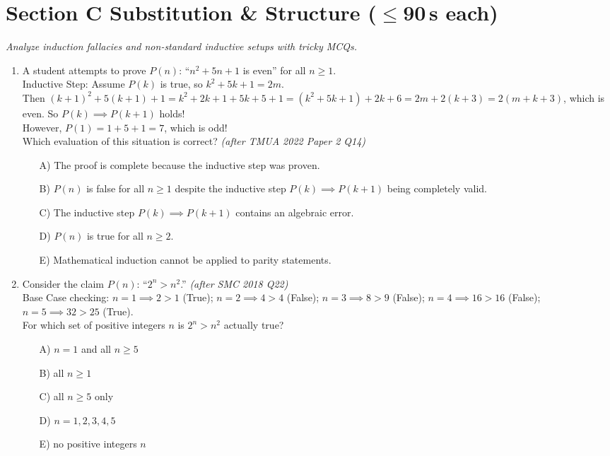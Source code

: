 \documentclass[11pt,a4paper]{article}
\begin{document}
\section*{Section C \quad Substitution \& Structure \hfill{\normalfont\small($\leq$90\,s each)}}

\noindent\textit{Analyze induction fallacies and non-standard inductive setups with tricky MCQs.}

\begin{enumerate}

\item A student attempts to prove $P(n)$: ``$n^2 + 5n + 1$ is even'' for all $n \ge 1$.\\
Inductive Step: Assume $P(k)$ is true, so $k^2 + 5k + 1 = 2m$.\\
Then $(k+1)^2 + 5(k+1) + 1 = k^2 + 2k + 1 + 5k + 5 + 1 = (k^2 + 5k + 1) + 2k + 6 = 2m + 2(k+3) = 2(m + k + 3)$, which is even. So $P(k) \implies P(k+1)$ holds!\\
However, $P(1) = 1 + 5 + 1 = 7$, which is odd!\\
Which evaluation of this situation is correct? \textit{\small(after TMUA 2022 Paper 2 Q14)}
\begin{itemize}
\item[A)] The proof is complete because the inductive step was proven.
\item[B)] $P(n)$ is false for all $n \ge 1$ despite the inductive step $P(k) \implies P(k+1)$ being completely valid.
\item[C)] The inductive step $P(k) \implies P(k+1)$ contains an algebraic error.
\item[D)] $P(n)$ is true for all $n \ge 2$.
\item[E)] Mathematical induction cannot be applied to parity statements.
\end{itemize}

\item Consider the claim $P(n)$: ``$2^n > n^2$.'' \textit{\small(after SMC 2018 Q22)}\\
Base Case checking: $n=1 \implies 2 > 1$ (True); $n=2 \implies 4 > 4$ (False); $n=3 \implies 8 > 9$ (False); $n=4 \implies 16 > 16$ (False); $n=5 \implies 32 > 25$ (True).\\
For which set of positive integers $n$ is $2^n > n^2$ actually true?
\begin{itemize}
\item[A)] $n = 1$ and all $n \ge 5$
\item[B)] all $n \ge 1$
\item[C)] all $n \ge 5$ only
\item[D)] $n = 1, 2, 3, 4, 5$
\item[E)] no positive integers $n$
\end{itemize}


\end{enumerate}
\end{document}
